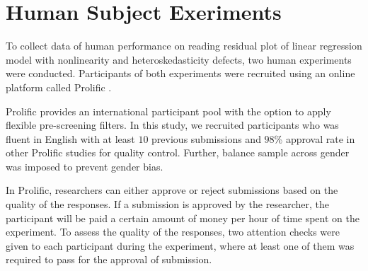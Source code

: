 \documentclass{monashthesis}
\begin{document}
\hypertarget{human-subject-exeriments}{%
\chapter{Human Subject Exeriments}\label{human-subject-exeriments}}

To collect data of human performance on reading residual plot of linear regression model with nonlinearity and heteroskedasticity defects, two human experiments were conducted. Participants of both experiments were recruited using an online platform called Prolific \autocite{prolific_prolific_2022}.

Prolific provides an international participant pool with the option to apply flexible pre-screening filters. In this study, we recruited participants who was fluent in English with at least \(10\) previous submissions and \(98\)\% approval rate in other Prolific studies for quality control. Further, balance sample across gender was imposed to prevent gender bias.

In Prolific, researchers can either approve or reject submissions based on the quality of the responses. If a submission is approved by the researcher, the participant will be paid a certain amount of money per hour of time spent on the experiment. To assess the quality of the responses, two attention checks were given to each participant during the experiment, where at least one of them was required to pass for the approval of submission.
\end{document}
